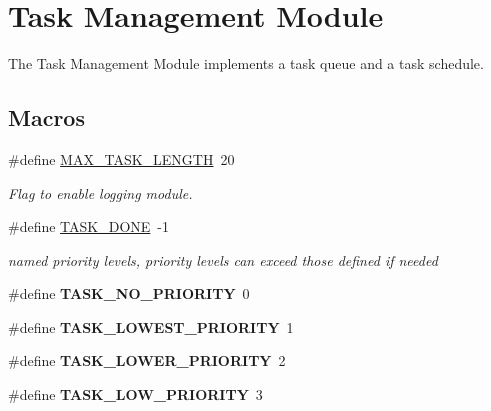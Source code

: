\hypertarget{group__task}{\section{Task Management Module}
\label{group__task}
}


The Task Management Module implements a task queue and a task schedule.  


\subsection*{Macros}
\begin{DoxyCompactItemize}
\item 
\#define \hyperlink{group__task_ga9a4bac1b8cbff5bb6fdbcbbf7d4bbb1d}{M\+A\+X\+\_\+\+T\+A\+S\+K\+\_\+\+L\+E\+N\+G\+T\+H}~20
\begin{DoxyCompactList}\small\item\em Flag to enable logging module. \end{DoxyCompactList}\item 
\#define \hyperlink{group__task_gafdc2d62fe9a4cfe15bef8ac978e4c120}{T\+A\+S\+K\+\_\+\+D\+O\+N\+E}~-\/1
\begin{DoxyCompactList}\small\item\em named priority levels, priority levels can exceed those defined if needed \end{DoxyCompactList}\item 
\hypertarget{group__task_gaa87a8858165659a9b2805e8d2ade16f5}{\#define {\bfseries T\+A\+S\+K\+\_\+\+N\+O\+\_\+\+P\+R\+I\+O\+R\+I\+T\+Y}~0}\label{group__task_gaa87a8858165659a9b2805e8d2ade16f5}

\item 
\hypertarget{group__task_ga3d13725c3632a0bb4715b86912e0df58}{\#define {\bfseries T\+A\+S\+K\+\_\+\+L\+O\+W\+E\+S\+T\+\_\+\+P\+R\+I\+O\+R\+I\+T\+Y}~1}\label{group__task_ga3d13725c3632a0bb4715b86912e0df58}

\item 
\hypertarget{group__task_gaa4aa390d23e3f1d294f685b1802f03cc}{\#define {\bfseries T\+A\+S\+K\+\_\+\+L\+O\+W\+E\+R\+\_\+\+P\+R\+I\+O\+R\+I\+T\+Y}~2}\label{group__task_gaa4aa390d23e3f1d294f685b1802f03cc}

\item 
\hypertarget{group__task_ga4ac150047c387d7509e1afa4c843c7bb}{\#define {\bfseries T\+A\+S\+K\+\_\+\+L\+O\+W\+\_\+\+P\+R\+I\+O\+R\+I\+T\+Y}~3}\label{group__task_ga4ac150047c387d7509e1afa4c843c7bb}


\end{DoxyCompactItemize}
